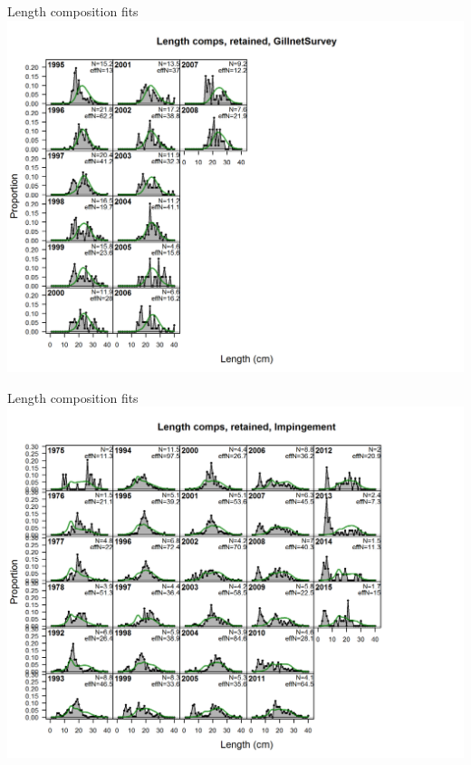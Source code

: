 \documentclass[ignorenonframetext,]{beamer}
\begin{document}
\begin{frame}{Length composition fits}\includegraphics{./r4ss/plots_mod1/comp_lenfit_flt9mkt2.png}\end{frame}

\begin{frame}{Length composition fits}\includegraphics{./r4ss/plots_mod1/comp_lenfit_flt10mkt2.png}\end{frame}
\end{document}
